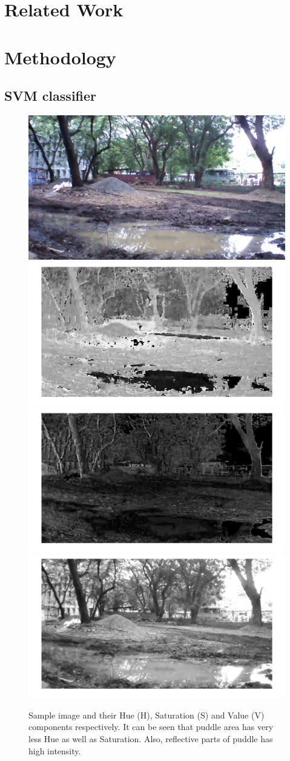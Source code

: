 \documentclass[times,10pt,twocolumn,letterpaper]{article}
\begin{document}
\cite{Microsoft15}

\section{Related Work}

\cite{rankin11}\cite{santana12}\cite{zhang10}

\section{Methodology}

\subsection{SVM classifier}


\begin{figure}[h!]
\centering
\includegraphics[width=0.22\linewidth]{images/IMG_PAIR_1_1.jpg}
\includegraphics[width=0.22\linewidth]{images/IMG_PAIR_1_1_H.jpg}
\includegraphics[width=0.22\linewidth]{images/IMG_PAIR_1_1_S.jpg}
\includegraphics[width=0.22\linewidth]{images/IMG_PAIR_1_1_V.jpg}
\caption{Sample image and their Hue (H), Saturation (S) and Value (V) components
respectively. It can be seen that puddle area has very less Hue as well
as Saturation. Also, reflective parts of puddle has high intensity.}
\label{fig:HSV}
\end{figure}

\cite{Chapelle99}
\end{document}

